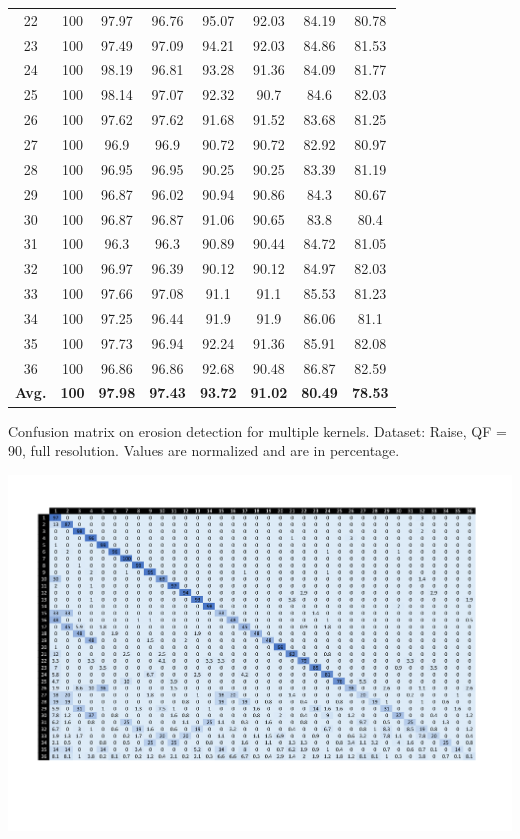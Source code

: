 \documentclass[review]{elsarticle}
\begin{document}
\begin{table}[!t]
\begin{minipage}{0.48\linewidth}
{\begin{tabular}{c|ccccccc}
				22&100&97.97&96.76&95.07&92.03&84.19&80.78\\
				23&100&97.49&97.09&94.21&92.03&84.86&81.53\\
				24&100&98.19&96.81&93.28&91.36&84.09&81.77\\
				25&100&98.14&97.07&92.32&90.7&84.6&82.03\\
				26&100&97.62&97.62&91.68&91.52&83.68&81.25\\
				27&100&96.9&96.9&90.72&90.72&82.92&80.97\\
				28&100&96.95&96.95&90.25&90.25&83.39&81.19\\
				29&100&96.87&96.02&90.94&90.86&84.3&80.67\\
				30&100&96.87&96.87&91.06&90.65&83.8&80.4\\
				31&100&96.3&96.3&90.89&90.44&84.72&81.05\\
				32&100&96.97&96.39&90.12&90.12&84.97&82.03\\
				33&100&97.66&97.08&91.1&91.1&85.53&81.23\\
				34&100&97.25&96.44&91.9&91.9&86.06&81.1\\
				35&100&97.73&96.94&92.24&91.36&85.91&82.08\\
				36&100&96.86&96.86&92.68&90.48&86.87&82.59\\
				
				\hline
				\textbf{Avg.}&\textbf{100}&\textbf{97.98}&\textbf{97.43}&\textbf{93.72}&\textbf{91.02}&\textbf{80.49}&\textbf{78.53}\\
				\hline\hline	
		\end{tabular}}
	\end{minipage}
\end{table}

\begin{table}
	\centering
	\caption{Confusion matrix on erosion detection for multiple kernels. Dataset: Raise, QF = 90, full resolution. Values are normalized and are in percentage.}
	\label{table:confusion}
	\includegraphics[width=\linewidth]{confusion}
\end{table}
\end{document}
